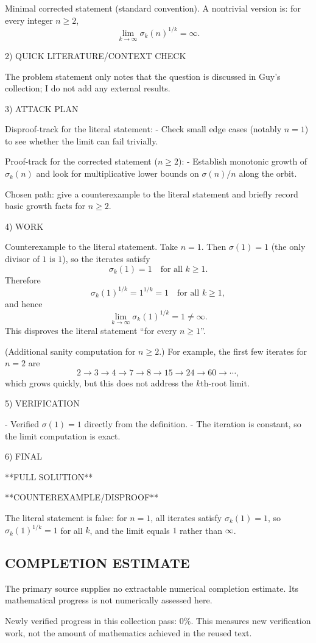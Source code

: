 Minimal corrected statement (standard convention).
A nontrivial version is: for every integer $n\ge 2$,
\[
\lim_{k\to\infty} \sigma_k(n)^{1/k}=\infty.
\]

2) QUICK LITERATURE/CONTEXT CHECK

The problem statement only notes that the question is discussed in Guy's collection; I do not add any external results.

3) ATTACK PLAN

Disproof-track for the literal statement:
- Check small edge cases (notably $n=1$) to see whether the limit can fail trivially.

Proof-track for the corrected statement ($n\ge 2$):
- Establish monotonic growth of $\sigma_k(n)$ and look for multiplicative lower bounds on $\sigma(n)/n$ along the orbit.

Chosen path: give a counterexample to the literal statement and briefly record basic growth facts for $n\ge 2$.

4) WORK

Counterexample to the literal statement.
Take $n=1$.
Then $\sigma(1)=1$ (the only divisor of $1$ is $1$), so the iterates satisfy
\[
\sigma_k(1)=1\quad\text{for all }k\ge 1.
\]
Therefore
\[
\sigma_k(1)^{1/k}=1^{1/k}=1\quad\text{for all }k\ge 1,
\]
and hence
\[
\lim_{k\to\infty} \sigma_k(1)^{1/k}=1\ne\infty.
\]
This disproves the literal statement “for every $n\ge 1$”.

(Additional sanity computation for $n\ge 2$.)
For example, the first few iterates for $n=2$ are
\[
2\to 3\to 4\to 7\to 8\to 15\to 24\to 60\to\cdots,
\]
which grows quickly, but this does not address the $k$th-root limit.

5) VERIFICATION

- Verified $\sigma(1)=1$ directly from the definition.
- The iteration is constant, so the limit computation is exact.

6) FINAL

**FULL SOLUTION**

**COUNTEREXAMPLE/DISPROOF**

The literal statement is false: for $n=1$, all iterates satisfy $\sigma_k(1)=1$, so $\sigma_k(1)^{1/k}=1$ for all $k$, and the limit equals $1$ rather than $\infty$.


\subsection*{COMPLETION ESTIMATE}
The primary source supplies no extractable numerical completion estimate. Its mathematical progress is not numerically assessed here.

Newly verified progress in this collection pass: $0\%$. This measures new verification work, not the amount of mathematics achieved in the reused text.
